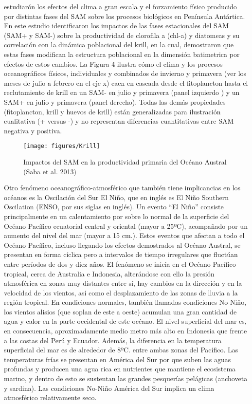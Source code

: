 \documentclass{sydneythesis}
\begin{document}
\autocite{Saba2014} estudiarón los efectos del clima a gran escala y el forzamiento físico producido por distintas fases del SAM sobre los procesos biológicos en Península Antártica. En este estudio identificaron los impactos de las fases estacionales del SAM (SAM+ y SAM-) sobre la productividad de clorofila a (chl-a) y diatomeas y su correlación con la dinámica poblacional del krill, en la cual, demostraron que estas fases modifican la estructura poblacional en la dimensión batimetrica por efectos de estos cambios. La Figura 4 ilustra cómo el clima y los procesos oceanográficos físicos, individuales y combinados de invierno y primavera (ver los meses de julio a febrero en el eje x) caen en cascada desde el fitoplancton hasta el reclutamiento de krill en un SAM- en julio y primavera (panel izquierdo ) y un SAM+ en julio y primavera (panel derecho). Todas las demás propiedades (fitoplancton, krill y huevos de krill) están generalizadas para ilustración cualitativa (+ versus -) y no representan diferencias cuantitativas entre SAM negativa y positiva.

\begin{figure}

{\centering \texttt{[image: figures/Krill]} 

}

\caption{Impactos del SAM en la productividad primaria del Océano Austral (Saba et al. 2013)}\label{fig:unnamed-chunk-4}
\end{figure}

Otro fenómeno oceanográfico-atmosférico que también tiene implicancias en los océanos es la Oscilación del Sur El Niño, que en inglés es El Niño Southern Oscilation (ENSO, por sus siglas en inglés). Un evento ``El Niño'' consiste principalmente en un calentamiento por sobre lo normal de la superficie del Océano Pacífico ecuatorial central y oriental (mayor a 25ºC), acompañado por un aumento del nivel del mar (mayor a 15 cm.). Estos eventos que afectan a todo el Océano Pacífico, incluso llegando los efectos demostrados al Océano Austral, se presentan en forma cíclica pero a intervalos de tiempo irregulares que fluctúan entre períodos de dos y diez años. El fenómeno se inicia en el Océano Pacífico tropical, cerca de Australia e Indonesia, alterándose con ello la presión atmosférica en zonas muy distantes entre sí, hay cambios en la dirección y en la velocidad de los vientos, así como el desplazamiento de las zonas de lluvia a la región tropical. En condiciones normales, también llamadas condiciones No-Niño, los vientos alisios (que soplan de este a oeste) acumulan una gran cantidad de agua y calor en la parte occidental de este océano. El nivel superficial del mar es, en consecuencia, aproximadamente medio metro más alto en Indonesia que frente a las costas del Perú y Ecuador. Además, la diferencia en la temperatura superficial del mar es de alrededor de 8ºC. entre ambas zonas del Pacífico. Las temperaturas frías se presentan en América del Sur por que suben las aguas profundas y producen una agua rica en nutrientes que mantiene el ecosistema marino, y dentro de esto se sustentan las grandes pesquerías pelágicas (anchoveta y sardina). Las condiciones No-Niño América del Sur implica un clima atmosférico relativamente seco.
\end{document}
